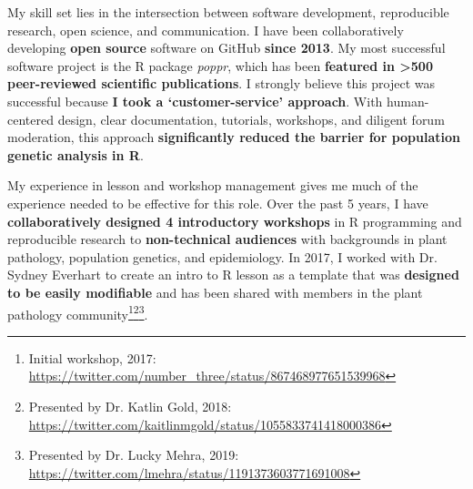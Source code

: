 \vspace{1ex}






My skill set lies in the intersection between software development,
reproducible research, open science, and communication.  I have been
collaboratively developing \textbf{open source} software on GitHub
\textbf{since 2013}. My most successful software project is the R package
\textit{poppr}, which has been \textbf{featured in \textgreater500
peer-reviewed scientific publications}. I strongly believe this project was
successful because \textbf{I took a `customer-service' approach}.  With
human-centered design, clear documentation, tutorials, workshops, and diligent
forum moderation, this approach \textbf{significantly reduced the barrier for
population genetic analysis in R}.

\vspace{1ex}

My experience in lesson and workshop management gives me much of the experience
needed to be effective for this role.  Over the past 5 years, I have
\textbf{collaboratively designed 4 introductory workshops} in R programming and
reproducible research to \textbf{non-technical audiences} with backgrounds in
plant pathology, population genetics, and epidemiology. In 2017, I worked with
Dr. Sydney Everhart to create an intro to R lesson as a template that was
\textbf{designed to be easily modifiable} and has been shared with members in
the plant pathology community\footnote{Initial workshop, 2017:
\url{https://twitter.com/number_three/status/867468977651539968}}\footnote{Presented
by Dr. Katlin Gold, 2018:
\url{https://twitter.com/kaitlinmgold/status/1055833741418000386}}\footnote{Presented
by Dr. Lucky Mehra, 2019:
\url{https://twitter.com/lmehra/status/1191373603771691008}}.

